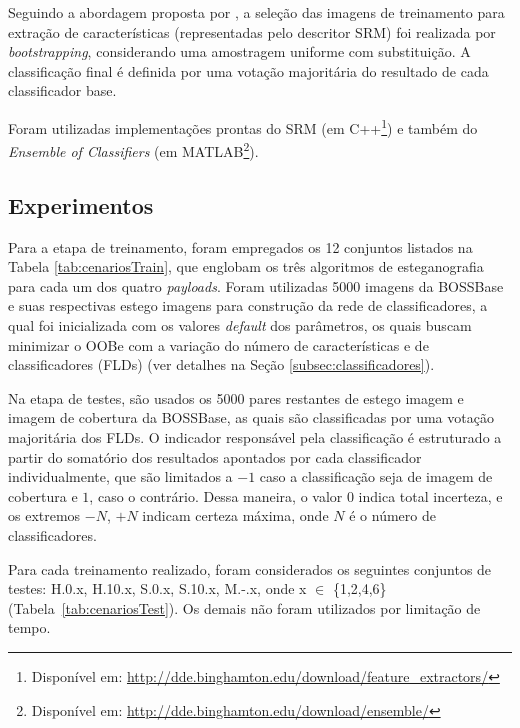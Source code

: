 Seguindo a abordagem proposta por  , a seleção das imagens de treinamento para extração de características (representadas pelo descritor SRM) foi realizada por \textit{bootstrapping}, considerando uma amostragem uniforme com substituição. A classificação final é definida por uma votação majoritária do resultado de cada classificador base.


Foram utilizadas implementações prontas do SRM (em C++\footnote{Disponível em: \url{http://dde.binghamton.edu/download/feature_extractors/}}) e também do \textit{Ensemble of Classifiers} (em MATLAB\footnote{Disponível em: \url{http://dde.binghamton.edu/download/ensemble/}}).

\subsection{Experimentos}

Para a etapa de treinamento, foram empregados os 12 conjuntos listados na Tabela \ref{tab:cenariosTrain}, que englobam os três algoritmos de esteganografia para cada um dos quatro \textit{payloads}. Foram utilizadas 5000 imagens da BOSSBase e suas respectivas estego imagens para construção da rede de classificadores, a qual foi inicializada com os valores \textit{default} dos parâmetros, os quais buscam minimizar o OOBe com a variação do número de características e de classificadores (FLDs) (ver detalhes na Seção \ref{subsec:classificadores}). 

Na etapa de testes, são usados os 5000 pares restantes de estego imagem e imagem de cobertura da BOSSBase, as quais são classificadas por uma votação majoritária dos FLDs. O indicador responsável pela classificação é estruturado a partir do somatório dos resultados apontados por cada classificador individualmente, que são limitados a $-1$ caso a classificação seja de imagem de cobertura e $1$, caso o contrário. Dessa maneira, o valor 0 indica total incerteza, e os extremos $-N$, $+N$ indicam certeza máxima, onde $N$ é o número de classificadores.

Para cada treinamento realizado, foram considerados os seguintes conjuntos de testes: H.0.x, H.10.x, S.0.x, S.10.x, M.-.x, onde x $\in$ \{1,2,4,6\} (Tabela~\ref{tab:cenariosTest}). Os demais não foram utilizados por limitação de tempo.

